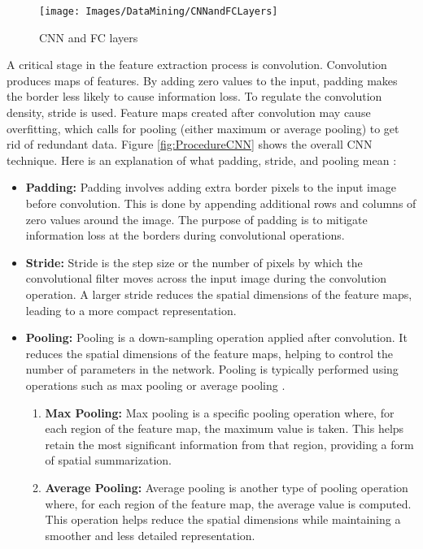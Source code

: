 \begin{figure}[h!]
	\centering
	\texttt{[image: Images/DataMining/CNNandFCLayers]}
	\caption{CNN and FC layers \cite{Win:2023}} \label{fig:CNNandFCLayers}
\end{figure}


A critical stage in the feature extraction process is convolution. Convolution produces maps of features. By adding zero values to the input, padding makes the border less likely to cause information loss. To regulate the convolution density, stride is used. Feature maps created after convolution may cause overfitting, which calls for pooling (either maximum or average pooling) to get rid of redundant data. Figure \ref{fig:ProcedureCNN} shows the overall CNN technique. Here is an explanation of what padding, stride, and pooling mean \cite{Li:2021}:

\begin{itemize}
	\item \textbf{Padding:} Padding involves adding extra border pixels to the input image before convolution. This is done by appending additional rows and columns of zero values around the image. The purpose of padding is to mitigate information loss at the borders during convolutional operations.
	
	\item \textbf{Stride:} Stride is the step size or the number of pixels by which the convolutional filter moves across the input image during the convolution operation. A larger stride reduces the spatial dimensions of the feature maps, leading to a more compact representation.
	
	\item \textbf{Pooling:} Pooling is a down-sampling operation applied after convolution. It reduces the spatial dimensions of the feature maps, helping to control the number of parameters in the network. Pooling is typically performed using operations such as max pooling or average pooling \cite{Win:2023}.
	
	\begin{enumerate}
		\item \textbf{Max Pooling:} Max pooling is a specific pooling operation where, for each region of the feature map, the maximum value is taken. This helps retain the most significant information from that region, providing a form of spatial summarization.
		
		\item \textbf{Average Pooling:} Average pooling is another type of pooling operation where, for each region of the feature map, the average value is computed. This operation helps reduce the spatial dimensions while maintaining a smoother and less detailed representation.
	\end{enumerate}
\end{itemize}


